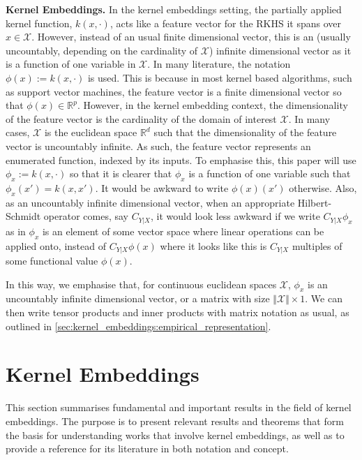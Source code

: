 \documentclass[twoside]{article} \usepackage{aistats2017}
\theoremstyle{definition}
\newcommand{\rv}[1]{{#1}}
\newcommand{\cardX}{\Vert \mathcal{X} \Vert}
\begin{document}
	\textbf{Kernel Embeddings.} In the kernel embeddings setting, the partially applied kernel function, $k(x, \cdot)$, acts like a feature vector for the RKHS it spans over $x \in \mathcal{X}$. However, instead of an usual finite dimensional vector, this is an (usually uncountably, depending on the cardinality of $\mathcal{X}$) infinite dimensional vector as it is a function of one variable in $\mathcal{X}$. In many literature, the notation $\phi(x) := k(x, \cdot)$ is used. This is because in most kernel based algorithms, such as support vector machines, the feature vector is a finite dimensional vector so that $\phi(x) \in \mathbb{R}^{p}$. However, in the kernel embedding context, the dimensionality of the feature vector is the cardinality of the domain of interest $\mathcal{X}$. In many cases, $\mathcal{X}$ is the euclidean space $\mathbb{R}^{d}$ such that the dimensionality of the feature vector is uncountably infinite. As such, the feature vector represents an enumerated function, indexed by its inputs. To emphasise this, this paper will use $\phi_{x} := k(x, \cdot)$ so that it is clearer that $\phi_{x}$ is a function of one variable such that $\phi_{x}(x') = k(x, x')$. It would be awkward to write $\phi(x)(x')$ otherwise. Also, as an uncountably infinite dimensional vector, when an appropriate Hilbert-Schmidt operator comes, say $C_{\rv{Y} | \rv{X}}$, it would look less awkward if we write $C_{\rv{Y} | \rv{X}} \phi_{x}$ as in $\phi_{x}$ is an element of some vector space where linear operations can be applied onto, instead of $C_{\rv{Y} | \rv{X}} \phi(x)$ where it looks like this is $C_{\rv{Y} | \rv{X}}$ multiples of some functional value $\phi(x)$.
	
	In this way, we emphasise that, for continuous euclidean spaces $\mathcal{X}$, $\phi_{x}$ is an uncountably infinite dimensional vector, or a matrix with size $\cardX \times 1$. We can then write tensor products and inner products with matrix notation as usual, as outlined in \cref{sec:kernel_embeddings:empirical_representation}.
	
\section{Kernel Embeddings}
\label{sec:kernel_embeddings}
	
	This section summarises fundamental and important results in the field of kernel embeddings. The purpose is to present relevant results and theorems that form the basis for understanding works that involve kernel embeddings, as well as to provide a reference for its literature in both notation and concept. 
	
\end{document}
